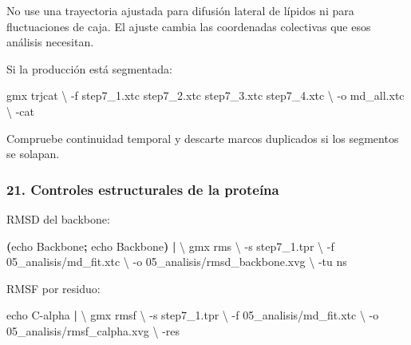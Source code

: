 \documentclass[
  spanish,
  11pt,
  a4paper]{article}
\newenvironment{Shaded}{\begin{snugshade}}{\end{snugshade}}
\newcommand{\AttributeTok}[1]{\textcolor[rgb]{0.13,0.29,0.53}{#1}}
\newcommand{\BuiltInTok}[1]{#1}
\newcommand{\DataTypeTok}[1]{\textcolor[rgb]{0.13,0.29,0.53}{#1}}
\newcommand{\ExtensionTok}[1]{#1}
\newcommand{\KeywordTok}[1]{\textcolor[rgb]{0.13,0.29,0.53}{\textbf{#1}}}
\newcommand{\NormalTok}[1]{#1}
\begin{document}
No use una trayectoria ajustada para difusión lateral de lípidos ni para
fluctuaciones de caja. El ajuste cambia las coordenadas colectivas que
esos análisis necesitan.

Si la producción está segmentada:

\begin{Shaded}
\begin{Highlighting}[]
\ExtensionTok{gmx}\NormalTok{ trjcat }\DataTypeTok{\textbackslash{}}
    \AttributeTok{{-}f}\NormalTok{ step7\_1.xtc step7\_2.xtc step7\_3.xtc step7\_4.xtc }\DataTypeTok{\textbackslash{}}
    \AttributeTok{{-}o}\NormalTok{ md\_all.xtc }\DataTypeTok{\textbackslash{}}
    \AttributeTok{{-}cat}
\end{Highlighting}
\end{Shaded}

Compruebe continuidad temporal y descarte marcos duplicados si los
segmentos se solapan.

\subsubsection{21. Controles estructurales de la
proteína}\label{controles-estructurales-de-la-proteuxedna}

RMSD del backbone:

\begin{Shaded}
\begin{Highlighting}[]
\KeywordTok{(}\BuiltInTok{echo}\NormalTok{ Backbone}\KeywordTok{;} \BuiltInTok{echo}\NormalTok{ Backbone}\KeywordTok{)} \KeywordTok{|} \DataTypeTok{\textbackslash{}}
\ExtensionTok{gmx}\NormalTok{ rms }\DataTypeTok{\textbackslash{}}
    \AttributeTok{{-}s}\NormalTok{ step7\_1.tpr }\DataTypeTok{\textbackslash{}}
    \AttributeTok{{-}f}\NormalTok{ 05\_analisis/md\_fit.xtc }\DataTypeTok{\textbackslash{}}
    \AttributeTok{{-}o}\NormalTok{ 05\_analisis/rmsd\_backbone.xvg }\DataTypeTok{\textbackslash{}}
    \AttributeTok{{-}tu}\NormalTok{ ns}
\end{Highlighting}
\end{Shaded}

RMSF por residuo:

\begin{Shaded}
\begin{Highlighting}[]
\BuiltInTok{echo}\NormalTok{ C{-}alpha }\KeywordTok{|} \DataTypeTok{\textbackslash{}}
\ExtensionTok{gmx}\NormalTok{ rmsf }\DataTypeTok{\textbackslash{}}
    \AttributeTok{{-}s}\NormalTok{ step7\_1.tpr }\DataTypeTok{\textbackslash{}}
    \AttributeTok{{-}f}\NormalTok{ 05\_analisis/md\_fit.xtc }\DataTypeTok{\textbackslash{}}
    \AttributeTok{{-}o}\NormalTok{ 05\_analisis/rmsf\_calpha.xvg }\DataTypeTok{\textbackslash{}}
    \AttributeTok{{-}res}
\end{Highlighting}
\end{Shaded}
\end{document}
